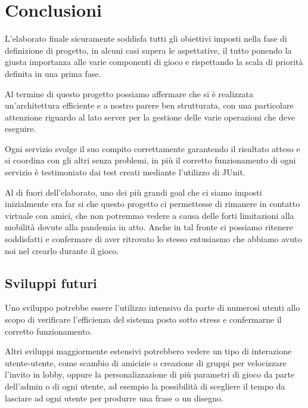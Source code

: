 \section{Conclusioni}
L'elaborato finale sicuramente soddisfa tutti gli obiettivi imposti nella fase di definizione di progetto, in alcuni casi supera le aspettative, il tutto ponendo la giusta importanza alle varie componenti di gioco e rispettando la scala di priorità definita in una prima fase. \newline

\noindent Al termine di questo progetto possiamo affermare che si è realizzata un'architettura efficiente e a nostro parere ben strutturata, con una particolare attenzione riguardo al lato server per la gestione delle varie operazioni che deve eseguire. \newline

\noindent Ogni servizio svolge il suo compito correttamente garantendo il risultato atteso e si coordina con gli altri senza problemi, in più il corretto funzionamento di ogni servizio è testimoniato dai test creati mediante l'utilizzo di JUnit. \newline

\noindent Al di fuori dell'elaborato, uno dei più grandi goal che ci siamo imposti inizialmente era far si che questo progetto ci permettesse di rimanere in contatto virtuale con amici, che non potremmo vedere a causa delle forti limitazioni alla mobilità dovute alla pandemia in atto. Anche in tal fronte ci possiamo ritenere soddisfatti e confermare di aver ritrovato lo stesso entusiasmo che abbiamo avuto noi nel crearlo durante il gioco.

\subsection{Sviluppi futuri}
Uno sviluppo potrebbe essere l'utilizzo intensivo da parte di numerosi utenti allo scopo di verificare l'efficienza del sistema posto sotto stress e confermarne il corretto funzionamento. \newline

\noindent Altri sviluppi maggiormente estensivi potrebbero vedere un tipo di interazione utente-utente, come scambio di amicizie o creazione di gruppi per velocizzare l'invito in lobby, oppure la personalizzazione di più parametri di gioco da parte dell'admin o di ogni utente, ad esempio la possibilità di scegliere il tempo da lasciare ad ogni utente per produrre una frase o un disegno.\newline

